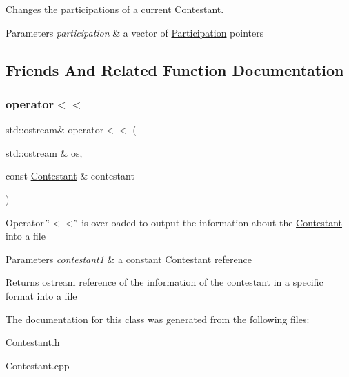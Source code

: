 Changes the participations of a current \hyperlink{class_contestant}{Contestant}. 


\begin{DoxyParams}{Parameters}
{\em participation} & a vector of \hyperlink{class_participation}{Participation} pointers \\
\hline
\end{DoxyParams}


\subsection{Friends And Related Function Documentation}
\mbox{\label{class_contestant_af6619c3c4998b08f93ea4a4568201ebe}} 
\subsubsection{\texorpdfstring{operator$<$$<$}{operator<<}}
{\footnotesize\ttfamily std\+::ostream\& operator$<$$<$ (\begin{DoxyParamCaption}\item[{std\+::ostream \&}]{os,  }\item[{const \hyperlink{class_contestant}{Contestant} \&}]{contestant }\end{DoxyParamCaption})\hspace{0.3cm}{\ttfamily [friend]}}

Operator \char`\"{}$<$$<$\char`\"{} is overloaded to output the information about the \hyperlink{class_contestant}{Contestant} into a file 
\begin{DoxyParams}{Parameters}
{\em contestant1} & a constant \hyperlink{class_contestant}{Contestant} reference \\
\hline
\end{DoxyParams}
\begin{DoxyReturn}{Returns}
ostream reference of the information of the contestant in a specific format into a file 
\end{DoxyReturn}


The documentation for this class was generated from the following files\+:\begin{DoxyCompactItemize}
\item 
Contestant.\+h\item 
Contestant.\+cpp\end{DoxyCompactItemize}
